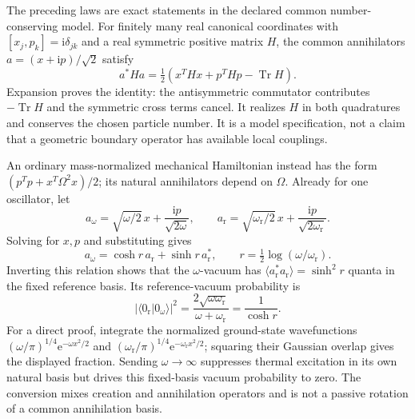 \documentclass[aps,pra,reprint,superscriptaddress,longbibliography]{revtex4-2}
\newcommand{\Tr}{\operatorname{Tr}}
\newcommand{\ee}{\mathrm e}
\begin{document}
The preceding laws are exact statements in the declared common
number-conserving model.  For finitely many real canonical coordinates
with $[x_j,p_k]=\mathrm i\delta_{jk}$ and a real symmetric positive
matrix $H$, the common annihilators $a=(x+\mathrm ip)/\sqrt2$ satisfy
\begin{equation}
 a^*Ha=\tfrac12(x^THx+p^THp-\Tr H).
 \label{sgt:bose:number-conserving-realization}
\end{equation}
Expansion proves the identity: the antisymmetric commutator contributes
$-\Tr H$ and the symmetric cross terms cancel.  It realizes $H$ in
both quadratures and conserves the chosen particle number.  It is a
model specification, not a claim that a geometric boundary operator
has available local couplings.

An ordinary mass-normalized mechanical Hamiltonian instead has the
form $(p^Tp+x^T\Omega^2x)/2$; its natural annihilators depend on
$\Omega$.  Already for one oscillator, let
\begin{equation}
 a_\omega=\sqrt{\omega/2}\,x+
                 \frac{\mathrm ip}{\sqrt{2\omega}},\qquad
 a_{\mathrm r}=\sqrt{\omega_{\mathrm r}/2}\,x+
                 \frac{\mathrm ip}{\sqrt{2\omega_{\mathrm r}}}.
 \label{sgt:bose:oscillator-modes}
\end{equation}
Solving for $x,p$ and substituting gives
\begin{equation}
 a_\omega=\cosh r\,a_{\mathrm r}
                 +\sinh r\,a_{\mathrm r}^*,
 \qquad r=\tfrac12\log(\omega/\omega_{\mathrm r}).
 \label{sgt:bose:bogoliubov}
\end{equation}
Inverting this relation shows that the $\omega$-vacuum has
$\langle a_{\mathrm r}^*a_{\mathrm r}\rangle=\sinh^2r$ quanta in the
fixed reference basis.  Its reference-vacuum probability is
\begin{equation}
 |\langle0_{\mathrm r}|0_\omega\rangle|^2
   =\frac{2\sqrt{\omega\omega_{\mathrm r}}}{\omega+\omega_{\mathrm r}}
   =\frac1{\cosh r}.
 \label{sgt:bose:vacuum-overlap}
\end{equation}
For a direct proof, integrate the normalized ground-state wavefunctions
$(\omega/\pi)^{1/4}\ee^{-\omega x^2/2}$ and
$(\omega_{\mathrm r}/\pi)^{1/4}\ee^{-\omega_{\mathrm r}x^2/2}$;
squaring their Gaussian overlap gives the displayed fraction.
Sending $\omega\to\infty$ suppresses thermal excitation in its own
natural basis but drives this fixed-basis vacuum probability to zero.
The conversion mixes creation and annihilation operators and is not
a passive rotation of a common annihilation basis.
\end{document}
